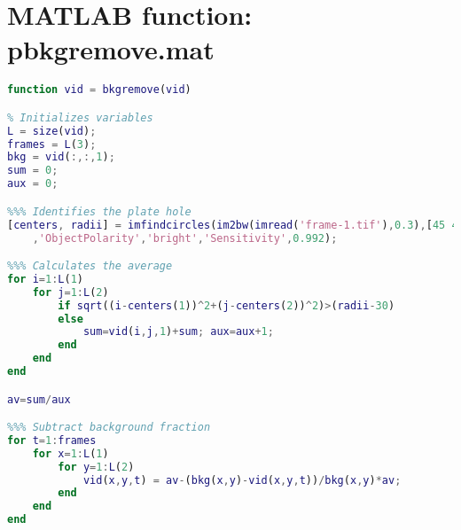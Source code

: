 \chapter{MATLAB function: pbkgremove.mat}
\label{ap:b}
\begin{lstlisting}[language=matlab]
function vid = bkgremove(vid)

% Initializes variables
L = size(vid);
frames = L(3);
bkg = vid(:,:,1);
sum = 0;
aux = 0;

%%% Identifies the plate hole
[centers, radii] = imfindcircles(im2bw(imread('frame-1.tif'),0.3),[45 47] ...
    ,'ObjectPolarity','bright','Sensitivity',0.992);

%%% Calculates the average
for i=1:L(1)
    for j=1:L(2)
        if sqrt((i-centers(1))^2+(j-centers(2))^2)>(radii-30)
        else
            sum=vid(i,j,1)+sum; aux=aux+1;
        end
    end
end

av=sum/aux

%%% Subtract background fraction
for t=1:frames
    for x=1:L(1)
        for y=1:L(2)
            vid(x,y,t) = av-(bkg(x,y)-vid(x,y,t))/bkg(x,y)*av;
        end
    end
end
\end{lstlisting}